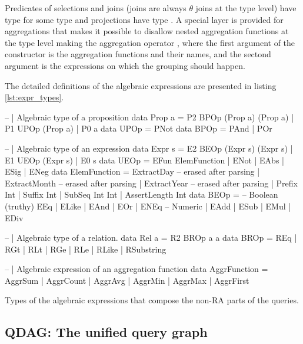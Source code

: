 Predicates of selections and joins (joins are always \(\theta\) joins
at the type level) have type  for some type
 and projections have type . A
special layer is provided for aggregations  that makes it
possible to disallow nested aggregation functions at the type level
making the aggregation operator , where the first argument of the constructor is the
aggregation functions and their names, and the sectond argument is the
expressions on which the grouping should happen.

The detailed definitions of the algebraic expressions are presented in
listing \ref{lst:expr_types}.

\begin{code}
  \begin{haskellcode}
    -- | Algebraic type of a proposition
    data Prop a = P2 BPOp (Prop a) (Prop a)
      | P1 UPOp (Prop a)
      | P0 a
    data UPOp = PNot
    data BPOp = PAnd | POr

    -- | Algebraic type of an expression
    data Expr s = E2 BEOp (Expr s) (Expr s)
      | E1 UEOp (Expr s)
      | E0 s
    data UEOp =
      EFun ElemFunction
      | ENot
      | EAbs
      | ESig
      | ENeg
    data ElemFunction
      = ExtractDay -- erased after parsing
      | ExtractMonth -- erased after parsing
      | ExtractYear -- erased after parsing
      | Prefix Int
      | Suffix Int
      | SubSeq Int Int
      | AssertLength Int
    data BEOp =
      -- Boolean (truthy)
      EEq | ELike | EAnd | EOr | ENEq
      -- Numeric
      | EAdd | ESub | EMul | EDiv

    -- | Algebraic type of a relation.
    data Rel a = R2 BROp a a
    data BROp
      = REq
      | RGt
      | RLt
      | RGe
      | RLe
      | RLike
      | RSubstring

    -- | Algebraic expression of an aggregation function
    data AggrFunction = AggrSum
      | AggrCount
      | AggrAvg
      | AggrMin
      | AggrMax
      | AggrFirst
  \end{haskellcode}
  \label{lst:expr_types}
  \caption{Types of the algebraic expressions that
    compose the non-RA parts of the queries.}
\end{code}


\subsection{QDAG: The unified query graph}
\label{sec:qdag}


